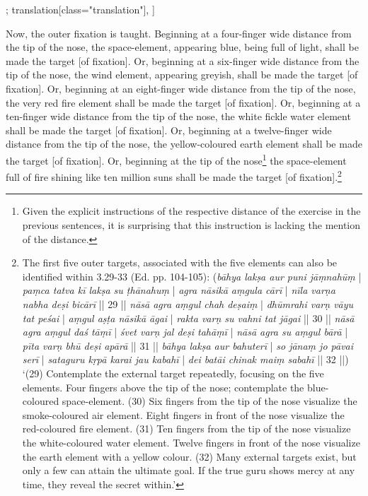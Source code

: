 \begin{alignment}[
  texts=edition[class="edition"];
  translation[class="translation"],
  ]
\begin{translation}
\begin{tlate}[p23_01]
  Now, the outer fixation is taught. Beginning at a four-finger wide distance from the tip of the nose, the space-element, appearing blue, being full of light, shall be made the target [of fixation]. Or, beginning at a six-finger wide distance from the tip of the nose, the wind element, appearing greyish, shall be made the target [of fixation]. Or, beginning at an eight-finger wide distance from the tip of the nose, the very red fire element shall be made the target [of fixation]. Or, beginning at a ten-finger wide distance from the tip of the nose, the white fickle water element shall be made the target [of fixation]. Or, beginning at a twelve-finger wide distance from the tip of the nose, the yellow-coloured earth element shall be made the target [of fixation]. Or, beginning at the tip of the nose\footnote{Given the explicit instructions of the respective distance of the exercise in the previous sentences, it is surprising that this instruction is lacking the mention of the distance.} the space-element full of fire shining like ten million suns shall be made the target [of fixation].\footnote{The first five outer targets, associated with the five elements can also be identified within  3.29-33 (Ed. pp. 104-105): (\textit{bāhya lakṣa aur puni jāṃnahūṃ} | \textit{paṃca tatva kī lakṣa su ṭhānahuṃ} | \textit{agra nāsikā aṃgula cārī} | \textit{nīla varṇa nabha deṣi bicārī} || 29 || \textit{nāsā agra aṃgul chah deṣaiṃ} | \textit{dhūmrahi varṇ vāyu tat peśai} | \textit{aṃgul aṣṭa nāsikā āgai} | \textit{rakta varṇ su vahni tat jāgai} || 30 || \textit{nāsā agra aṃgul daś tāṃī} | \textit{śvet varṇ jal deṣi tahāṃī} | \textit{nāsā agra su aṃgul bārā} | \textit{pīta varṇ bhū deṣi apārā} || 31 || \textit{bāhya lakṣa aur bahuterī} | \textit{so jānaṃ jo pāvai serī} | \textit{sataguru kṛpā karai jau kabahī} | \textit{dei batāi chinak maiṃ sabahī} || 32 ||) `(29) Contemplate the external target repeatedly, focusing on the five elements. Four fingers above the tip of the nose; contemplate the blue-coloured space-element. (30) Six fingers from the tip of the nose visualize the smoke-coloured air element. Eight fingers in front of the nose visualize the red-coloured fire element. (31)  Ten fingers from the tip of the nose visualize the white-coloured water element. Twelve fingers in front of the nose visualize the earth element with a yellow colour. (32) Many external targets exist, but only a few can attain the ultimate goal. If the true guru shows mercy at any time, they reveal the secret within.'}
  \flushpage 
    \end{tlate}
  \end{translation}
\end{alignment}
